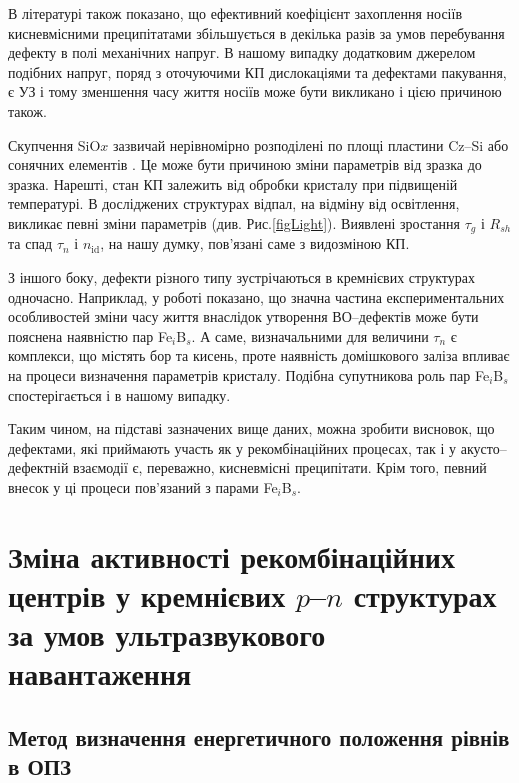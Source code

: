 В літературі \cite{MurphyJAP2011} також показано, що ефективний коефіцієнт захоплення носіїв кисневмісними
преципітатами збільшується в декілька разів за умов перебування дефекту в полі механічних напруг.
В нашому випадку додатковим джерелом подібних напруг, поряд
з оточуючими КП дислокаціями та дефектами пакування, є УЗ і тому зменшення
часу життя носіїв може бути викликано і цією причиною також.

Скупчення SiO$x$ зазвичай нерівномірно розподілені по площі пластини  Cz--Si \cite{Oxide_Schon} або сонячних елементів \cite{Oxide:Chen}.
Це може бути причиною зміни параметрів від зразка до зразка.
Нарешті,  стан КП залежить від обробки кристалу при підвищеній температурі.
В досліджених структурах відпал, на відміну від освітлення, викликає певні зміни параметрів (див. Рис.\ref{figLight}).
Виявлені зростання $\tau_g$ і $R_{sh}$ та спад $\tau_n$ і $n_\mathrm{id}$, на нашу думку, пов'язані саме з видозміною КП.

З іншого боку, дефекти різного типу зустрічаються в кремнієвих структурах одночасно.
Наприклад, у роботі \cite{BO:Fe} показано, що значна частина експериментальних особливостей зміни часу життя
внаслідок утворення ВО--дефектів може бути пояснена наявністю
пар  Fe$_i$B$_s$.
А саме, визначальними для величини $\tau_n$ є комплекси, що містять бор та кисень, проте
наявність домішкового заліза впливає на процеси визначення параметрів кристалу.
Подібна супутникова роль пар Fe$_i$B$_s$ спостерігається і в нашому випадку.

Таким чином, на підставі зазначених вище даних, можна зробити висновок,
що дефектами, які приймають участь як у рекомбінаційних процесах, так і у акусто--дефектній взаємодії є, переважно,
кисневмісні преципітати.
Крім того, певний внесок у ці процеси пов'язаний з парами Fe$_i$B$_s$.

\section{Зміна активності рекомбінаційних центрів у кремнієвих $p$--$n$ структурах за умов ультразвукового навантаження\label{sBulyrMethod}}

\subsection{Метод визначення енергетичного положення рівнів в ОПЗ}

